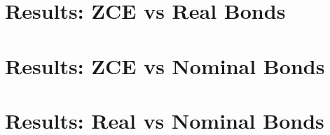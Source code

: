 \documentclass{article}
\begin{document}
%	
    \section{Results: ZCE vs Real Bonds}
    
    \vspace{0.2cm}
    
    \newpage
    \section{Results: ZCE vs Nominal Bonds}
    
      \vspace{0.2cm}
    
    \newpage
    \section{Results: Real vs Nominal Bonds}
    
\end{document}
